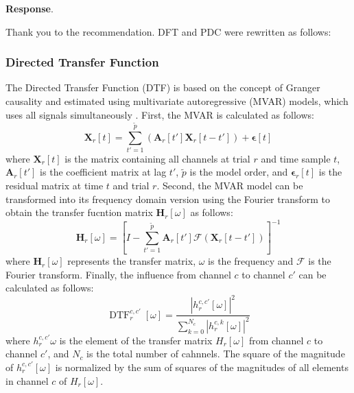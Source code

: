 \documentclass[runningheads]{llncs}
\newcommand{\mat}[1]{\bm {#1}}
\newenvironment{reviewer}{\setcounter{pointcounter}{1}}{}
\newcommand{\changes}[1]{\textcolor[rgb]{1.00,0.00,0.00}{#1}}
\newcommand{\reply}{\medskip \noindent \textbf{Response}.\ }
\begin{document}
\begin{reviewer}
  \reply{
    Thank you to the recommendation. DFT and PDC were rewritten as follows:
    \changes{
      \subsubsection{Directed Transfer Function}
      The Directed Transfer Function (DTF) is based on the concept of
      Granger causality and estimated using multivariate
      autoregressive (MVAR) models, which uses all signals
      simultaneously \cite{rezaei2023classification}. First, the MVAR
      is calculated as follows:
      \begin{equation}
        \mat{X}_{r}[t] = \sum_{t'=1}^{\tilde{p}} \left(
        \mat{A}_{r}[t'] \mat{X}_{r}[t-t'] \right) + \mat{\epsilon}[t]
      \end{equation}
      where $\mat{X}_{r}[t]$ is the matrix containing all channels at
      trial $r$ and time sample $t$, $\mat{A}_{r}[t']$ is the
      coefficient matrix at lag $t'$, $\tilde{p}$ is the model order,
      and $\mat{\epsilon}_{r}[t]$ is the residual matrix at time $t$
      and trial $r$. Second, the MVAR model can be transformed into
      its frequency domain version using the Fourier transform to
      obtain the transfer fucntion matrix $\mat{H}_{r}[\omega]$ as follows:
      \begin{equation}
        \mat{H}_{r}[\omega] = \left[ I - \sum_{t'=1}^{\tilde{p}}
        \mat{A}_{r}[t'] \mathscr{F}\left( \mat{X}_{r}[t-t'] \right) \right]^{-1}
      \end{equation}
      where $\mat{H}_{r}[\omega]$ represents the transfer matrix,
      $\omega$ is the frequency and $\mathscr{F}$ is the Fourier
      transform. Finally, the influence from channel $c$ to channel
      $c'$ can be calculated as follows:
      \begin{equation}
        \operatorname{DTF}^{c,c'}_{r}[\omega] =
        \frac{|h^{c,c'}_{r}[\omega]|^2}{\sum_{k=0}^{N_c}
        |h^{c,k}_{r}[\omega]|^2}
      \end{equation}
      where $h^{c,c'}_{r}{\omega}$ is the element of the transfer
      matrix $H_{r}[\omega]$ from channel $c$ to channel $c'$, and
      $N_c$ is the total number of cahnnels. The square of the
      magnitude of $h^{c,c'}_{r}[\omega]$ is normalized by the sum of
      squares of the magnitudes of all elements in channel $c$ of
      $H_{r}[\omega]$.
    }

}
\end{reviewer}
\end{document}
